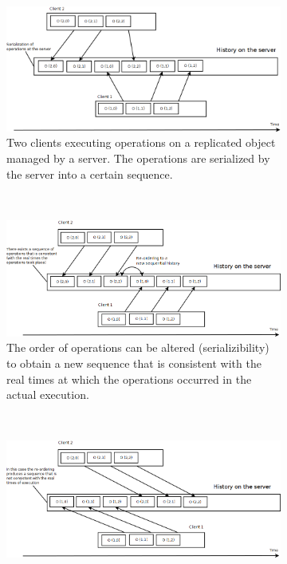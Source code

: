 \begin{figure}
        \centering
        \begin{subfigure}[t]{0.3\textwidth}
                                        \centering
                                        \includegraphics[width=\textwidth]{img/linearizability_1}
                                        \caption{Two clients executing operations on a replicated object managed by a server. The operations are serialized by the server into a certain sequence.}
                                        \label{figure:linearizability:a}
        \end{subfigure}%
        ~
        \begin{subfigure}[t]{0.3\textwidth}
                                        \centering
                                        \includegraphics[width=\textwidth]{img/linearizability_2}
                                        \caption{The order of operations can be altered (serializibility) to obtain a new sequence that is consistent with the real times at which the operations occurred in the actual execution.}
                                        \label{figure:linearizability:b}
        \end{subfigure}
        ~
        \begin{subfigure}[t]{0.3\textwidth}
                                        \centering
                                        \includegraphics[width=\textwidth]{img/linearizability_3}

\end{subfigure}
\end{figure}
